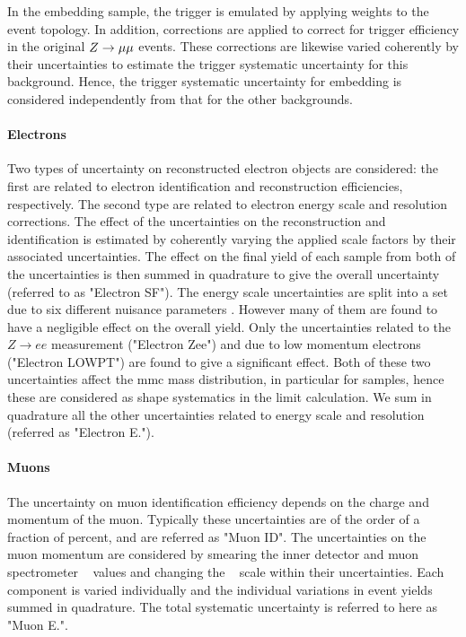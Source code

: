 In the embedding sample, the trigger is emulated by applying weights to the event
topology. In addition, corrections are applied to correct for trigger efficiency in the original $Z\rightarrow \mu\mu$ events. 
These corrections are likewise varied coherently by their uncertainties to estimate the trigger systematic uncertainty 
for this background. Hence, the trigger systematic uncertainty for embedding is considered independently
from that for the other backgrounds.

\paragraph{Electrons}
Two types of uncertainty on reconstructed electron objects are considered:
the first are related to electron identification and reconstruction efficiencies, respectively. 
The second type are related to electron energy scale and resolution corrections.
The effect of the uncertainties on the reconstruction and identification is estimated by coherently varying the applied scale factors by their 
associated uncertainties. The effect on the final yield of each sample from both of the uncertainties is then 
summed in quadrature to give the overall uncertainty (referred to as "Electron SF").
The energy scale uncertainties are split into a set due to six different nuisance parameters \cite{EGammaEnergy}. 
However many of them are found to have a negligible effect on the overall yield. Only the uncertainties 
related to the $Z \rightarrow ee$ measurement ("Electron Zee") 
and due to low momentum electrons ("Electron LOWPT") are found to give a significant effect. Both of these two uncertainties affect the mmc mass distribution, in particular for 
\Ztautau samples, hence these are considered as shape systematics in the limit calculation.
We sum in quadrature all the other uncertainties related to energy scale and resolution (referred as "Electron E.").

\paragraph{Muons}
The uncertainty on muon identification efficiency depends on the charge and momentum of the muon.
Typically these uncertainties are of the order of a fraction of percent, and are referred as "Muon ID". 
The uncertainties on the muon momentum are considered by smearing  the inner detector and muon spectrometer \pt~ 
values and changing the \pt~ scale within their uncertainties. 
Each component is varied individually and the individual variations in event yields 
summed in quadrature. The total systematic uncertainty is referred to here as "Muon E.".

